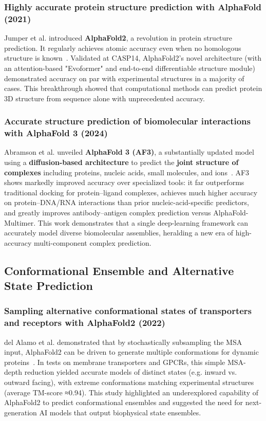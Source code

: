 \subsubsection{Highly accurate protein structure prediction with AlphaFold (2021)}

Jumper et al.
introduced \textbf{AlphaFold2}, a revolution in protein structure prediction.
It regularly achieves atomic accuracy even when no homologous structure is known~\cite{Jumper2021AlphaFold2}.
Validated at CASP14, AlphaFold2's novel architecture (with an attention-based "Evoformer" and end-to-end differentiable structure module) demonstrated accuracy on par with experimental structures in a majority of cases.
This breakthrough showed that computational methods can predict protein 3D structure from sequence alone with unprecedented accuracy.

\subsubsection{Accurate structure prediction of biomolecular interactions with AlphaFold 3 (2024)}

Abramson et al.
unveiled \textbf{AlphaFold 3 (AF3)}, a substantially updated model using a \textbf{diffusion-based architecture} to predict the \textbf{joint structure of complexes} including proteins, nucleic acids, small molecules, and ions~\cite{Abramson2024AlphaFold3}.
AF3 shows markedly improved accuracy over specialized tools: it far outperforms traditional docking for protein–ligand complexes, achieves much higher accuracy on protein–DNA/RNA interactions than prior nucleic-acid-specific predictors, and greatly improves antibody–antigen complex prediction versus AlphaFold-Multimer.
This work demonstrates that a single deep-learning framework can accurately model diverse biomolecular assemblies, heralding a new era of high-accuracy multi-component complex prediction.

\subsection{Conformational Ensemble and Alternative State Prediction}

\subsubsection{Sampling alternative conformational states of transporters and receptors with AlphaFold2 (2022)}

del Alamo et al.
demonstrated that by stochastically subsampling the MSA input, AlphaFold2 can be driven to generate multiple conformations for dynamic proteins~\cite{delAlamo2022AlternativeStates}.
In tests on membrane transporters and GPCRs, this simple MSA-depth reduction yielded accurate models of distinct states (e.g. inward vs.
outward facing), with extreme conformations matching experimental structures (average TM-score ≈0.94).
This study highlighted an underexplored capability of AlphaFold2 to predict conformational ensembles and suggested the need for next-generation AI models that output biophysical state ensembles.

